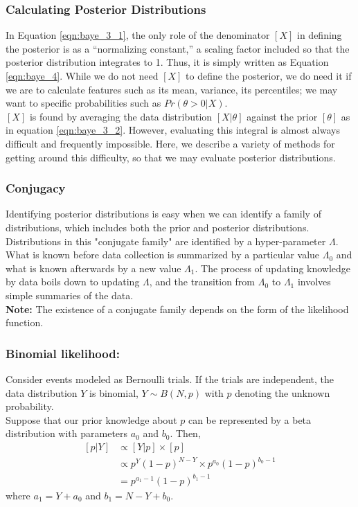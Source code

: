 			\subsubsection{Calculating Posterior Distributions}
				In Equation \eqref{eqn:baye_3_1}, the only role of the denominator $[X]$ in defining the posterior is as a “normalizing constant,” a scaling factor included so that the posterior distribution integrates to 1. Thus, it is simply written as Equation \eqref{eqn:baye_4}. While we do not need $[X]$ to define the posterior, we do need it if we are to calculate features such as its mean, variance, its percentiles; we may want to specific probabilities such as $Pr(\theta >0|X)$.\\

				$[X]$ is found by averaging the data distribution $[X|\theta]$ against the prior $[\theta]$ as in equation \eqref{eqn:baye_3_2}. However, evaluating this integral is almost always difficult and frequently impossible. Here, we describe a variety of methods for getting around this difficulty, so that we may evaluate posterior distributions.

			\subsubsection{Conjugacy}
				Identifying posterior distributions is easy when we can identify a family of distributions, which includes both the prior and posterior distributions. Distributions in this "conjugate family" are identified by a hyper-parameter $\Lambda$.\\
				What is known before data collection is summarized by a particular value $\Lambda_0$ and what is known afterwards by a new value $\Lambda_1$. The process of updating knowledge by data boils down to updating $\Lambda$, and the transition from $\Lambda_0$ to $\Lambda_1$ involves simple summaries of the data.\\
				\textbf{Note:} The existence of a conjugate family depends on the form of the likelihood function.

				\subsubsection{Binomial likelihood:}
					Consider events modeled as Bernoulli trials. If the trials are independent, the data distribution $Y$ is binomial, $Y \sim B(N,p)$ with $p$ denoting the unknown probability.\\
					Suppose that our prior knowledge about $p$ can be represented by a beta distribution with parameters $a_0$ and $b_0$. Then,
					\begin{equation*}
						\begin{aligned}
							[p|Y] &\propto [Y|p]\times[p]\\
							&\propto p^{Y}(1-p)^{N-Y} \times p^{a_0}(1-p)^{b_0-1}\\
							&=p^{a_1-1}(1-p)^{b_1-1}
						\end{aligned}
					\end{equation*}
					where $a_1 = Y+a_0$ and $b_1 = N-Y+b_0$.\\

